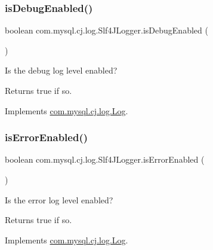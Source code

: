 \subsubsection{\texorpdfstring{is\+Debug\+Enabled()}{isDebugEnabled()}}
{\footnotesize\ttfamily boolean com.\+mysql.\+cj.\+log.\+Slf4\+J\+Logger.\+is\+Debug\+Enabled (\begin{DoxyParamCaption}{ }\end{DoxyParamCaption})}

Is the \textquotesingle{}debug\textquotesingle{} log level enabled?

\begin{DoxyReturn}{Returns}
true if so. 
\end{DoxyReturn}


Implements \mbox{\hyperlink{interfacecom_1_1mysql_1_1cj_1_1log_1_1_log_a8340f13152932af117ec2f5884c06dd3}{com.\+mysql.\+cj.\+log.\+Log}}.

\mbox{\label{classcom_1_1mysql_1_1cj_1_1log_1_1_slf4_j_logger_a3401a68eb92f0e0eec87e8140c36faa7}} 
\subsubsection{\texorpdfstring{is\+Error\+Enabled()}{isErrorEnabled()}}
{\footnotesize\ttfamily boolean com.\+mysql.\+cj.\+log.\+Slf4\+J\+Logger.\+is\+Error\+Enabled (\begin{DoxyParamCaption}{ }\end{DoxyParamCaption})}

Is the \textquotesingle{}error\textquotesingle{} log level enabled?

\begin{DoxyReturn}{Returns}
true if so. 
\end{DoxyReturn}


Implements \mbox{\hyperlink{interfacecom_1_1mysql_1_1cj_1_1log_1_1_log_abda4b698026fdb26c74b211b521628c9}{com.\+mysql.\+cj.\+log.\+Log}}.

\mbox{\label{classcom_1_1mysql_1_1cj_1_1log_1_1_slf4_j_logger_ae5ee0af225f5bc993dc023b8b31de983}} 
